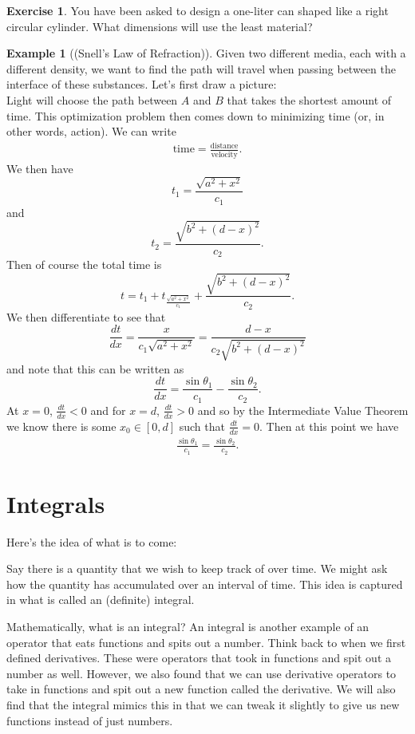 \documentclass[leqno]{article}
\theoremstyle{definition}
\newtheorem{example}{Example}[section]
\newtheorem{exercise}{Exercise}[section]
\theoremstyle{remark}
\theoremstyle{theorem}
\begin{document}
\begin{exercise}
You have been asked to design a one-liter can shaped like a right circular cylinder. What dimensions will use the least material?
\vspace*{10cm}
\end{exercise}

\begin{example}[(Snell's Law of Refraction)]
Given two different media, each with a different density, we want to find the path will travel when passing between the interface of these substances. Let's first draw a picture:
\vspace*{5cm}\\

Light will choose the path between $A$ and $B$ that takes the shortest amount of time.  This optimization problem then comes down to minimizing time (or, in other words, action). We can write
\begin{align*}
\textrm{time}=\frac{\textrm{distance}}{\textrm{velocity}}.
\end{align*}  
We then have
\[
t_1 = \frac{\sqrt{a^2+x^2}}{c_1}
\]
and
\[
t_2 = \frac{\sqrt{b^2+(d-x)^2}}{c_2}.
\]
Then of course the total time is
\[
t=t_1+t_\frac{\sqrt{a^2+x^2}}{c_1}+\frac{\sqrt{b^2+(d-x)^2}}{c_2}.
\]
We then differentiate to see that
\[
\frac{dt}{dx}=\frac{x}{c_1 \sqrt{a^2+x^2}}=\frac{d-x}{c_2\sqrt{b^2+(d-x)^2}}
\]
and note that this can be written as
\[
\frac{dt}{dx}=\frac{\sin \theta_1}{c_1}-\frac{\sin \theta_2}{c_2}.
\]
At $x=0$, $\frac{dt}{dx}<0$ and for $x=d$, $\frac{dt}{dx}>0$ and so by the Intermediate Value Theorem we know there is some $x_0\in [0,d]$ such that $\frac{dt}{dx}=0$.  Then at this point we have
\begin{align*}
\frac{\sin \theta_1}{c_1}=\frac{\sin \theta_2}{c_2}.
\end{align*}
\end{example}

\section{Integrals}

Here's the idea of what is to come:

Say there is a quantity that we wish to keep track of over time.  We might ask how the quantity has accumulated over an interval of time.  This idea is captured in what is called an (definite) integral.  

Mathematically, what is an integral?  An integral is another example of an operator that eats functions and spits out a number.  Think back to when we first defined derivatives.  These were operators that took in functions and spit out a number as well.  However, we also found that we can use derivative operators to take in functions and spit out a new function called the derivative.  We will also find that the integral mimics this in that we can tweak it slightly to give us new functions instead of just numbers.
\end{document}
